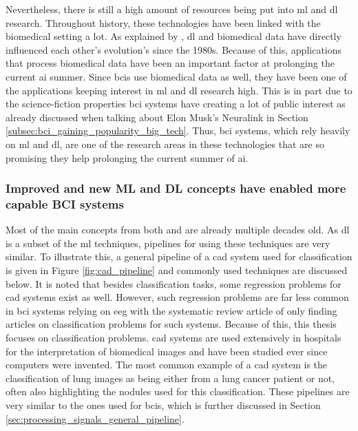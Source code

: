Nevertheless, there is still a high amount of resources being put into \gls{ml} and \gls{dl} research.
Throughout history, these technologies have been linked with the biomedical setting a lot.
As explained by \citet{dl_and_biomedical}, \gls{dl} and biomedical data have directly influenced each other's evolution's since the 1980s.
Because of this, applications that process biomedical data have been an important factor at prolonging the current \gls{ai} summer.
Since \glspl{bci} use biomedical data as well, they have been one of the applications keeping interest in \gls{ml} and \gls{dl} research high.
This is in part due to the science-fiction properties \gls{bci} systems have creating a lot of public interest as already discussed when talking about Elon Musk's Neuralink in Section \ref{subsec:bci_gaining_popularity_big_tech}.
Thus, \gls{bci} systems, which rely heavily on \gls{ml} and \gls{dl}, are one of the research areas in these technologies that are so promising they help prolonging the current summer of \gls{ai}.


\subsubsection{Improved and new ML and DL concepts have enabled more capable BCI systems}
\label{subsubsec:bci_gaining_popularity_improved_data_processing_better_ml_dl}

Most of the main concepts from both  and  are already multiple decades old.
As \gls{dl} is a subset of the \gls{ml} techniques, pipelines for using these techniques are very similar.
To illustrate this, a general pipeline of a \gls{cad} system used for classification is given in Figure \ref{fig:cad_pipeline} and commonly used techniques are discussed below.
It is noted that besides classification tasks, some regression problems for \gls{cad} systems exist as well.
However, such regression problems are far less common in \gls{bci} systems relying on \gls{eeg} with the systematic review article of \citet{bci_review_arnau} only finding articles on classification problems for such systems.
Because of this, this thesis focuses on classification problems.
\gls{cad} systems are used extensively in hospitals for the interpretation of biomedical images and have been studied ever since computers were invented.
The most common example of a \gls{cad} system is the classification of lung images as being either from a lung cancer patient or not, often also highlighting the nodules used for this classification.
These pipelines are very similar to the ones used for \glspl{bci}, which is further discussed in Section \ref{sec:processing_signals_general_pipeline}.


